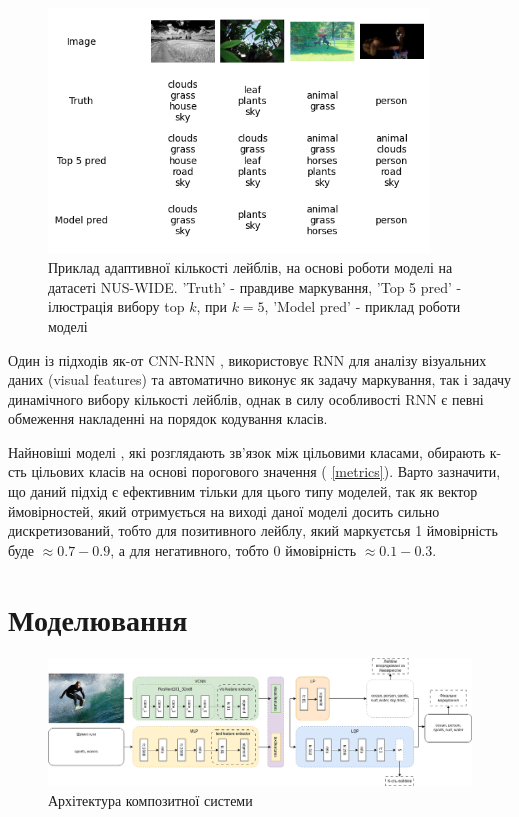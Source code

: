 \documentclass{udstu}
\begin{document}
\begin{figure}[!ht]
	\centering
	\includegraphics[width=0.9\textwidth]{PNG/test-topk-144}
	\caption{
	Приклад адаптивної кількості лейблів,
	на основі роботи моделі на датасеті NUS-WIDE.
	'Truth' - правдиве маркування,
	'Top 5 pred' - ілюстрація вибору top $k$, при $k=5$,
	'Model pred' - приклад роботи моделі
	}
	\label{figure:test-topk}
\end{figure}

Один із підходів як-от CNN-RNN \cite{cnn-rnn},
використовує RNN для аналізу візуальних даних (visual features) та автоматично виконує як задачу маркування,
так і задачу динамічного вибору кількості лейблів, однак в силу особливості RNN є певні обмеження
накладенні на порядок кодування класів.

Найновіші моделі \cite{q2l, cpsd, cma}, які розглядають зв'язок між цільовими класами, обирають
к-сть цільових класів на основі порогового значення (\chaptername{ \ref{metrics}}). Варто зазначити, що
даний підхід є ефективним тільки для цього типу моделей, так як вектор ймовірностей, який отримується на виході
даної моделі досить сильно дискретизований,
тобто для позитивного лейблу, який маркуєтсья 1 ймовірність буде $\approx 0.7-0.9$,
а для негативного, тобто 0 ймовірність $\approx 0.1-0.3$.


\chapter{Моделювання}

\begin{figure}[!ht]
	\centering
	\includegraphics[width=1.0\textwidth]{PNG/composite}
	\caption{Архітектура композитної системи}
	\label{figure:composite}
\end{figure}
\end{document}
